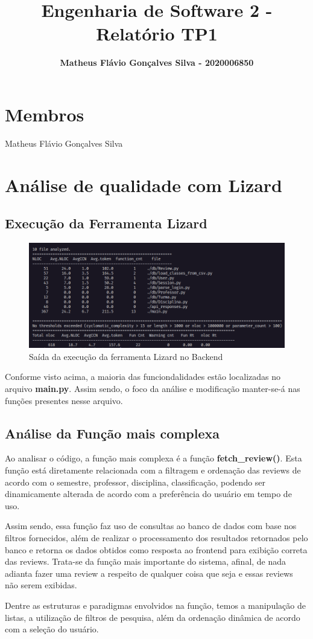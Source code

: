 \documentclass[12pt]{article}
\title{\textbf{Engenharia de Software 2 - Relatório TP1}}
\author{\textbf{Matheus Flávio Gonçalves Silva - 2020006850}}
\date{\parbox{\linewidth}{\centering%
    Universidade Federal de Minas Gerais (UFMG)\endgraf
    Belo Horizonte - MG - Brasil\endgraf\bigskip
    \href{mailto:matheusfgs@ufmg.br}{matheusfgs@ufmg.br}}}
\begin{document}
\maketitle


\section {Membros}
Matheus Flávio Gonçalves Silva


\section{Análise de qualidade com Lizard}
\subsection{Execução da Ferramenta Lizard}
\begin{figure}[h]
	\includegraphics[scale=0.52]{Figure1.png}
	\caption{Saída da execução da ferramenta Lizard no Backend}	
\end{figure}
\par Conforme visto acima, a maioria das funciondalidades estão localizadas no arquivo \textbf{main.py}. Assim sendo, o foco da análise e modificação manter-se-á nas funções presentes nesse arquivo.

\subsection{Análise da Função mais complexa}
\par Ao analisar o código, a função mais complexa é a função \textbf{fetch\_review()}. Esta função está diretamente relacionada com a filtragem e ordenação das reviews de acordo com o semestre, professor, disciplina, classificação, podendo ser dinamicamente alterada de acordo com a preferência do usuário em tempo de uso.
\par Assim sendo, essa função faz uso de consultas ao banco de dados com base nos filtros fornecidos, além de realizar o processamento dos resultados retornados pelo banco e retorna os dados obtidos como resposta ao frontend para exibição correta das reviews. Trata-se da função mais importante do sistema, afinal, de nada adianta fazer uma review a respeito de qualquer coisa que seja e essas reviews não serem exibidas.
\par Dentre as estruturas e paradigmas envolvidos na função, temos a manipulação de listas, a utilização de filtros de pesquisa, além da ordenação dinâmica de acordo com a seleção do usuário.
\end{document}
